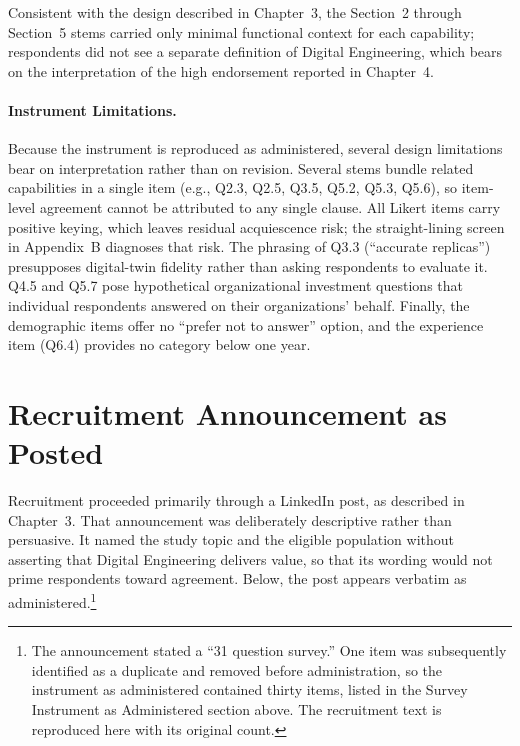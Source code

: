   Consistent with the design described in Chapter~3, the Section~2 through Section~5 stems carried only minimal functional context for each capability; respondents did not see a separate definition of Digital Engineering, which bears on the interpretation of the high endorsement reported in Chapter~4.

  \paragraph{Instrument Limitations.} Because the instrument is reproduced as administered, several design limitations bear on interpretation rather than on revision. Several stems bundle related capabilities in a single item (e.g., Q2.3, Q2.5, Q3.5, Q5.2, Q5.3, Q5.6), so item-level agreement cannot be attributed to any single clause. All Likert items carry positive keying, which leaves residual acquiescence risk; the straight-lining screen in Appendix~B diagnoses that risk. The phrasing of Q3.3 (``accurate replicas'') presupposes digital-twin fidelity rather than asking respondents to evaluate it. Q4.5 and Q5.7 pose hypothetical organizational investment questions that individual respondents answered on their organizations' behalf. Finally, the demographic items offer no ``prefer not to answer'' option, and the experience item (Q6.4) provides no category below one year.

  \section{Recruitment Announcement as Posted}\label{sec:recruitment-announcement}

  Recruitment proceeded primarily through a LinkedIn post, as described in Chapter~3. That announcement was deliberately descriptive rather than persuasive. It named the study topic and the eligible population without asserting that Digital Engineering delivers value, so that its wording would not prime respondents toward agreement. Below, the post appears verbatim as administered.\footnote{The announcement stated a ``31 question survey.'' One item was subsequently identified as a duplicate and removed before administration, so the instrument as administered contained thirty items, listed in the Survey Instrument as Administered section above. The recruitment text is reproduced here with its original count.}

